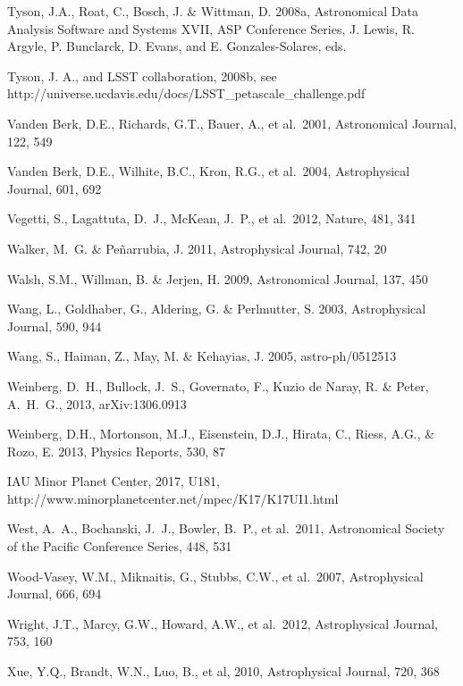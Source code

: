 \documentclass{emulateapj}
\begin{document}
\begin{thebibliography}{}
\bibitem[()]{} Tyson, J.A., Roat, C., Bosch, J. \& Wittman, D. 2008a, Astronomical
             Data Analysis Software and Systems XVII, ASP Conference Series,
             J. Lewis, R. Argyle, P. Bunclarck, D. Evans, and E. Gonzales-Solares, eds.

\bibitem[()]{} Tyson, J. A., and LSST collaboration, 2008b, see
                 http://universe.ucdavis.edu/docs/LSST\_petascale\_challenge.pdf

\bibitem[()]{} Vanden Berk, D.E., Richards, G.T., Bauer, A., et al.~2001, Astronomical Journal, 122, 549

\bibitem[()]{} Vanden Berk, D.E., Wilhite, B.C., Kron, R.G., et al.~2004, Astrophysical Journal, 601, 692

\bibitem[()]{} Vegetti, S., Lagattuta, D.~J., McKean, J.~P., et al.\ 2012, Nature, 481, 341

\bibitem[()]{} Walker, M.~G. \& Pe{\~n}arrubia, J. 2011, Astrophysical Journal, 742, 20


\bibitem[()]{} Walsh, S.M., Willman, B. \& Jerjen, H. 2009, Astronomical Journal, 137, 450

\bibitem[()]{} Wang, L., Goldhaber, G., Aldering, G. \& Perlmutter, S. 2003, Astrophysical Journal, 590, 944

\bibitem[()]{} Wang, S., Haiman, Z., May, M. \& Kehayias, J. 2005, astro-ph/0512513

\bibitem[()]{} Weinberg, D.~H., Bullock, J.~S., Governato, F., Kuzio de Naray, R. \& Peter, A.~H.~G., 2013, arXiv:1306.0913

\bibitem[()]{} Weinberg, D.H., Mortonson, M.J., Eisenstein, D.J.,
  Hirata, C., Riess, A.G., \& Rozo, E. 2013, Physics Reports, 530, 87

IAU Minor Planet Center, 2017, U181, http://www.minorplanetcenter.net/mpec/K17/K17UI1.html

\bibitem[()]{} West, A.~A., Bochanski, J.~J., Bowler, B.~P., et al.~2011, Astronomical Society of the Pacific
                  Conference Series, 448, 531

\bibitem[()]{} Wood-Vasey, W.M., Miknaitis, G., Stubbs, C.W., et al.~2007, Astrophysical Journal, 666, 694

\bibitem[()]{} Wright, J.T., Marcy, G.W., Howard, A.W., et al.~2012, Astrophysical Journal, 753, 160

\bibitem[()]{} Xue, Y.Q., Brandt, W.N., Luo, B., et al, 2010,  Astrophysical Journal, 720, 368


\end{thebibliography}
\end{document}
